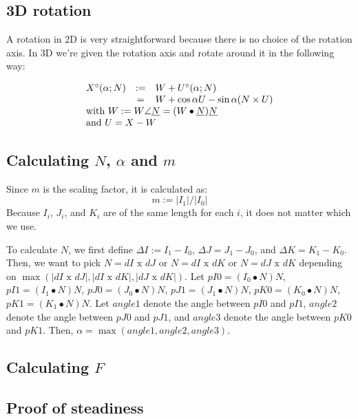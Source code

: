 \documentclass[journal, letterpaper]{IEEEtran}
\begin{document}
\subsection{3D rotation}
A rotation in 2D is very straightforward because there is no choice of the rotation axis. In 3D we're given the rotation axis and rotate around it in the following way:

\begin{equation}
\begin{array}{lcl}
 X^{\circ}(\alpha; N) &:=& W + U^{\circ}(\alpha; N) \\
                        & =& W + \cos \alpha U - \sin \alpha (N \times U) \\
 \multicolumn{3}{l}{\text{with } W := W\angle\underline{N} = (W\bullet\underline{N})\underline{N}} \\
 \multicolumn{3}{l}{\text{and } U = X-W}
\end{array}
\label{eq:Rotation}
\end{equation}

\subsection{Calculating $N$, $\alpha$ and $m$}
Since $m$ is the scaling factor, it is calculated as:
\begin{equation}
 m := |I_1| / |I_0|
\label{eq:m}
\end{equation}
Because $I_i$, $J_i$, and $K_i$ are of the same length for each $i$, it does not matter which we use. 
 
To calculate $N$, we first define $\Delta I := I_1 - I_0$, $\Delta J = J_1 - J_0$, and $\Delta K = K_1 - K_0$. Then, we want to pick $N = dI\text{ x }dJ$ or $N = dI\text{ x }dK$ or $N = dJ\text{ x }dK$ depending on $\max{(|dI\text{ x }dJ|, |dI\text{ x  }dK|, |dJ\text{ x }dK|)}$.  
Let $pI0 = (I_0 \bullet N)N$, $pI1 = (I_1 \bullet N)N$, $pJ0 = (J_0 \bullet N)N$, $pJ1 = (J_1 \bullet N)N$, $pK0 = (K_0 \bullet N)N$, $pK1 = (K_1 \bullet N)N$.  Let $angle1$ denote the angle between $pI0$ and $pI1$, $angle2$ denote the angle between $pJ0$ and $pJ1$, and $angle3$ denote the angle between $pK0$ and $pK1$.  Then, $\alpha = \max{(angle1, angle2, angle3)}$. 

\subsection{Calculating $F$}

\subsection{Proof of steadiness}
\end{document}
